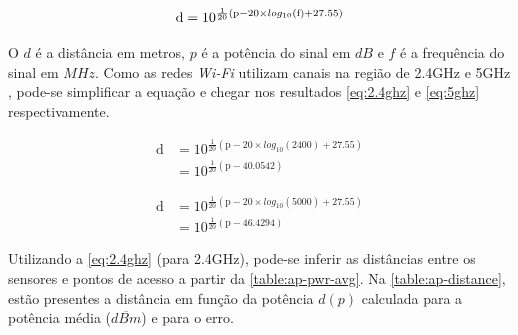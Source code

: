 \begin{equation}
	\text{d} = 10 ^{ \frac{1}{20} \left( \text{p} - 20 \times log_{10}\left(\text{f}\right)  + 27.55 \right) } \\
\end{equation}

O $d$ é a distância em metros, $p$ é a potência do sinal em $dB$ e $f$
é a frequência do sinal em $MHz$. Como as redes \emph{Wi-Fi} utilizam canais na região
de 2.4GHz e 5GHz \cite{ieee80211}, pode-se simplificar a equação e chegar nos
resultados \autoref{eq:2.4ghz} e \autoref{eq:5ghz} respectivamente.

\begin{align}
\text{d}	&= 10 ^{ \frac{1}{20} \left( \text{p} - 20 \times log_{10}\left(\text{2400}\right)  + 27.55 \right) } \nonumber \\
			&= 10 ^{ \frac{1}{20} \left( \text{p} - 40.0542 \right) } \label{eq:2.4ghz}
\end{align}

\begin{align}
\text{d}	&= 10 ^{ \frac{1}{20} \left( \text{p} - 20 \times log_{10}\left(\text{5000}\right)  + 27.55 \right) } \nonumber \\
			&= 10 ^{ \frac{1}{20} \left( \text{p} - 46.4294 \right) } \label{eq:5ghz}
\end{align}

Utilizando a \autoref{eq:2.4ghz} (para 2.4GHz), pode-se inferir as distâncias entre os sensores
e pontos de acesso a partir da \autoref{table:ap-pwr-avg}. Na
\autoref{table:ap-distance}, estão presentes a distância em função da potência $d(p)$
calculada para a potência média ($\overline{dBm}$) e para o erro.


\begin{table}[htb]
\end{table}

